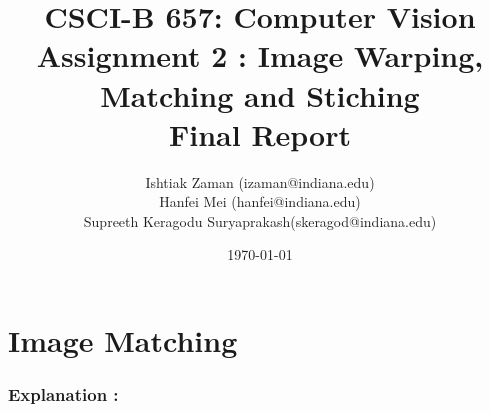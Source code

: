 \documentclass{article}
\begin{document}
\title{CSCI-B 657: Computer Vision \\ Assignment 2 : Image Warping, Matching and Stiching \\ Final Report}         %
	\author{Ishtiak Zaman (izaman@indiana.edu) \\ Hanfei Mei (hanfei@indiana.edu) \\Supreeth Keragodu Suryaprakash(skeragod@indiana.edu)}        %
	\date{\today}          %
	\maketitle
	
	\makeatother
	
	\pagestyle{plain}
		\part{Image Matching}
	
	\section{Explanation : }
	
\end{document}
